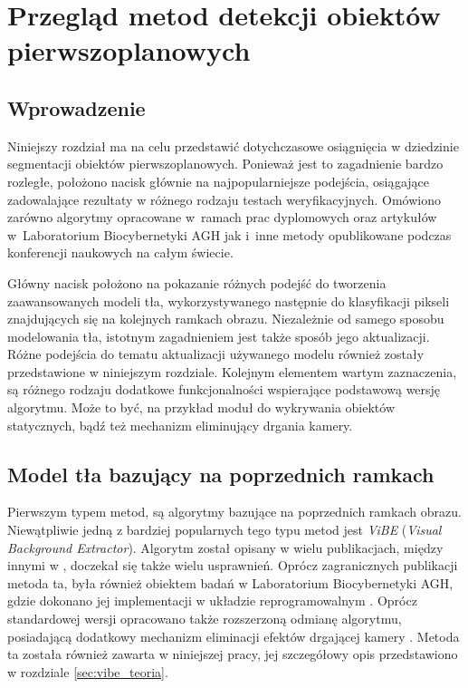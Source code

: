 \chapter{Przegląd metod detekcji obiektów pierwszoplanowych}
\label{cha:przeglad_metod}

\section{Wprowadzenie}
\label{sec:przeglad_wprowadzenie}

Niniejszy rozdział ma na celu przedstawić dotychczasowe osiągnięcia w dziedzinie segmentacji obiektów pierwszoplanowych. 
Ponieważ jest to zagadnienie bardzo rozległe, położono nacisk głównie na najpopularniejsze podejścia, osiągające zadowalające rezultaty w różnego rodzaju testach weryfikacyjnych. 
Omówiono zarówno algorytmy opracowane w~ramach prac dyplomowych oraz artykułów w~Laboratorium Biocybernetyki AGH jak i~inne metody opublikowane podczas konferencji naukowych na całym świecie. 

Główny nacisk położono na pokazanie różnych podejść do tworzenia zaawansowanych modeli tła, wykorzystywanego następnie do klasyfikacji pikseli znajdujących się na kolejnych ramkach obrazu. 
Niezależnie od samego sposobu modelowania tła, istotnym zagadnieniem jest także sposób jego aktualizacji. 
Różne podejścia do tematu aktualizacji używanego modelu również zostały przedstawione w niniejszym rozdziale. 
Kolejnym elementem wartym zaznaczenia, są różnego rodzaju dodatkowe funkcjonalności wspierające podstawową wersję algorytmu. 
Może to być, na przykład moduł do wykrywania obiektów statycznych, bądź też mechanizm eliminujący drgania kamery.


\section{Model tła bazujący na poprzednich ramkach}
\label{sec:model_poprzednie_ramki}

Pierwszym typem metod, są algorytmy bazujące na poprzednich ramkach obrazu. Niewątpliwie jedną z bardziej popularnych tego typu metod jest \textit{ViBE} (\textit{Visual Background Extractor}). 
Algorytm został opisany w wielu publikacjach, między innymi w \cite{barnich_11, droogenbroeck_12}, doczekał się także wielu usprawnień.
Oprócz zagranicznych publikacji metoda ta, była również obiektem badań w Laboratorium Biocybernetyki AGH, gdzie dokonano jej implementacji w układzie reprogramowalnym \cite{kryjak_13_vibe}. 
Oprócz standardowej wersji opracowano także rozszerzoną odmianę algorytmu, posiadającą dodatkowy mechanizm eliminacji efektów drgającej kamery \cite{kryjak_14_vibe}. 
Metoda ta została również zawarta w niniejszej pracy, jej szczegółowy opis przedstawiono w rozdziale \ref{sec:vibe_teoria}.


